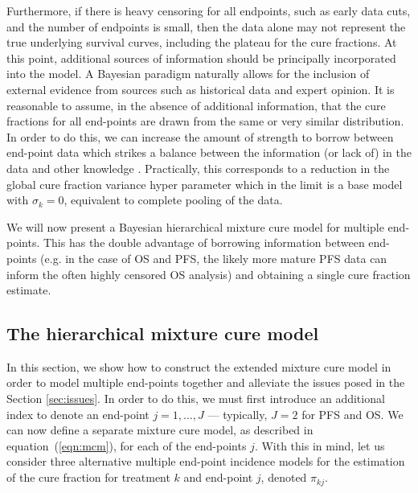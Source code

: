 \documentclass[AMA,STIX1COL]{WileyNJD-v2}
\begin{document}
Furthermore, if there is heavy censoring for all endpoints, such as early data cuts, and the number of endpoints is small, then the data alone may not represent the true underlying survival curves, including the plateau for the cure fractions.
At this point, additional sources of information should be principally incorporated into the model. A Bayesian paradigm naturally allows for the inclusion of external evidence from sources such as historical data and expert opinion. It is reasonable to assume, in the absence of additional information, that the cure fractions for all end-points are drawn from the same or very similar distribution. In order to do this, we can increase the amount of strength to borrow between end-point data which strikes a balance between the information (or lack of) in the data and other knowledge \cite{Nikolaidis2021}. Practically, this corresponds to a reduction in the global cure fraction variance hyper parameter which in the limit is a base model with $\sigma_k=0$, equivalent to complete pooling of the data. 

We will now present a Bayesian hierarchical mixture cure model for multiple end-points.
This has the double advantage of borrowing information between end-points
(e.g. in the case of OS and PFS, the likely more mature PFS data can inform the often highly censored OS analysis) and obtaining a single cure fraction estimate.

%
\subsection{The hierarchical mixture cure model} \label{sec:hier_model}
In this section, we show how to construct the extended mixture cure model in order to model multiple end-points together and alleviate the issues posed in the Section \ref{sec:issues}. In order to do this, we must first introduce an additional index to denote an end-point $j = 1, \ldots, J$ --- typically, $J=2$ for PFS and OS. We can now define a separate mixture cure model, as described in equation~(\ref{eqn:mcm}), for each of the end-points $j$. With this in mind, let us consider three alternative multiple end-point incidence models for the estimation of the cure fraction for treatment $k$ and end-point $j$, denoted $\pi_{kj}$.
\end{document}
